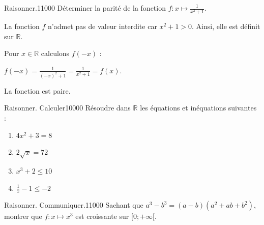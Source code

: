 
\begin{pageParcourst} %

\begin{ExoCtN}{Raisonner.}{1}{1}{0}{0}{0}
Déterminer la parité de la fonction $f:x\mapsto \frac{1}{x^2+1}$.


La fonction $f$ n'admet pas de valeur interdite car $x^2+1>0$. Ainsi, elle est définit sur $\mathbb{R}$.

Pour $x\in \mathbb{R}$ calculons $f(-x)$ :

$f(-x)=\frac{1}{(-x)^2+1}=\frac{1}{x^2+1}=f(x)$.

La fonction est paire.
\end{ExoCtN}

\begin{ExoCtN}{Raisonner. Calculer}{1}{0}{0}{0}{0}
Résoudre dans $\mathbb{R}$ les équations et inéquations suivantes :

\begin{enumerate}
\item $4x^2+3=8$
\item $2\sqrt{x}=72$
\item $x^3+2\leq 10$
\item $\frac{1}{x}-1\leq-2$
\end{enumerate}

\end{ExoCtN}

\begin{ExoCtN}{Raisonner. Communiquer.}{1}{1}{0}{0}{0}
Sachant que $a^3-b^3=(a-b)(a^2+ab+b^2)$, montrer que $f:x\mapsto x^3$ est croissante sur $[0;+\infty[$.\vspace{.2cm}



\end{ExoCtN}
\end{pageParcourst}
